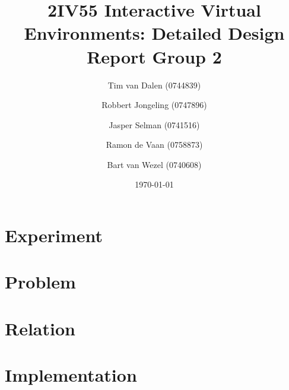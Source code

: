 \documentclass[a4paper,11pt]{article}
\title{
	2IV55 Interactive Virtual Environments: Detailed Design Report Group 2
}
\author{
	Tim van Dalen (0744839)
	\and
	Robbert Jongeling (0747896)
	\and
	Jasper Selman (0741516)
	\and
	Ramon de Vaan (0758873)
	\and
	Bart van Wezel (0740608)
}
\date{\today}
\begin{document}
	\maketitle
	
	\section{Experiment}
	\label{sec:experiment}
	
	
	\section{Problem}
	\label{sec:problem}
	

	\section{Relation}
	\label{sec:relation}
	

	\section{Implementation}
	\label{sec:implementation}
	

	
\end{document}
